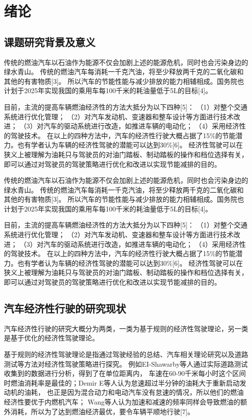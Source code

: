 \chapter{绪论}
\section{课题研究背景及意义}
\par  传统的燃油汽车以石油作为能源不仅会加剧上述的能源危机，同时也会污染身边的绿水青山。
传统的燃油汽车每消耗一千克汽油，将至少释放两千克的二氧化碳和其他的有害物质[3]。
所以汽车的节能性能与减少排放的能力相辅相成。国务院也计划于2025年实现我国的乘用车每100千米的耗油量低于5L的目标[4]。

\par  目前，主流的提高车辆燃油经济性的方法大抵分为以下四种[5]：
    （1）对整个交通系统进行优化管理；
    （2）对汽车发动机、变速器和整车设计等方面进行技术改进；
    （3）对汽车的驱动系统进行改造，如推进车辆的电动化；
    （4）采用经济性的驾驶技术。
在以上的四种方法中，汽车的经济性行驶大概占据了15\%的节能潜力。也有学者认为车辆的经济性驾驶的潜能可以达到30\%[6]。
经济性驾驶可以在狭义上被理解为油耗只与驾驶员的对油门踏板、制动踏板的操作和档位选择有关，
即可以通过对驾驶员的驾驶策略进行优化和改进以实现节能减排的目的。

\par  传统的燃油汽车以石油作为能源不仅会加剧上述的能源危机，同时也会污染身边的绿水青山。
传统的燃油汽车每消耗一千克汽油，将至少释放两千克的二氧化碳和其他的有害物质[3]。
所以汽车的节能性能与减少排放的能力相辅相成。国务院也计划于2025年实现我国的乘用车每100千米的耗油量低于5L的目标[4]。

\par  目前，主流的提高车辆燃油经济性的方法大抵分为以下四种[5]：
    （1）对整个交通系统进行优化管理；
    （2）对汽车发动机、变速器和整车设计等方面进行技术改进；
    （3）对汽车的驱动系统进行改造，如推进车辆的电动化；
    （4）采用经济性的驾驶技术。
在以上的四种方法中，汽车的经济性行驶大概占据了15\%的节能潜力。也有学者认为车辆的经济性驾驶的潜能可以达到30\%[6]。
经济性驾驶可以在狭义上被理解为油耗只与驾驶员的对油门踏板、制动踏板的操作和档位选择有关，
即可以通过对驾驶员的驾驶策略进行优化和改进以实现节能减排的目的。

\section{汽车经济性行驶的研究现状}
\par  汽车经济性行驶的研究大概分为两类，一类为基于规则的经济性驾驶理论，另一类是基于优化的经济性驾驶理论。
\par  基于规则的经济性驾驶理论是指通过驾驶经验的总结、汽车相关理论研究以及道路测试等方法对经济性驾驶策略进行探究。
例如EI-Shawarby等人通过实际道路测试收集到的数据进行分析，得到了在单位距离内，
车速在60-90千米每小时这个区间时燃油消耗率是最佳的；Demir E等人认为怠速超过半分钟的油耗大于重新启动发动机的油耗，
也正是因为混合动力和电动汽车没有怠速的情况，所以他们的燃油经济性要优于内燃机汽车；
Wang等人认为加速和减速的频率同样会导致燃油的额外消耗，所以为了达到燃油经济最优，要令车辆平顺地行驶[7]。

